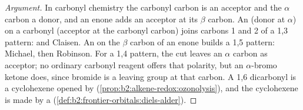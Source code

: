 \begin{proof}[Argument]
In carbonyl chemistry the carbonyl carbon is an acceptor and the $\alpha$ carbon a donor, and an enone
adds an acceptor at its $\beta$ carbon. An  (donor at $\alpha$) on a carbonyl (acceptor at the
carbonyl carbon) joins carbons 1 and 2 of a 1,3 pattern:  and Claisen. An  on the $\beta$
carbon of an enone builds a 1,5 pattern: Michael, then Robinson. For a 1,4 pattern, the cut leaves an
$\alpha$ carbon as acceptor; no ordinary carbonyl reagent offers that polarity, but an $\alpha$-bromo
ketone does, since bromide is a leaving group at that carbon. A 1,6 dicarbonyl is a cyclohexene opened
by  (\cref{prop:b2:alkene-redox:ozonolysis}), and the cyclohexene is made by a  (\cref{def:b2:frontier-orbitals:diels-alder}).
\end{proof}

